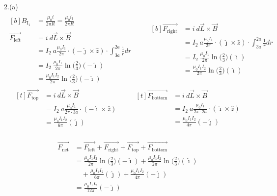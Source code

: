 \documentclass[11pt]{article}
\begin{document}
2.(a)
\begin{align*}
\begin{aligned}[b]
B_{\mathrm{I}_1} &= \frac{\mu_0 i}{2 \pi R} = \frac{\mu_0 i_1 }{2 \pi R} \\
\\
\overrightarrow{F_{\mathrm{left}}} &= i\ d\vec{L} \times \vec{B} \\
  &= I_2 \ a \frac{\mu_0 I_1 }{2 \pi } \cdot (-\hat{\jmath} \times \hat{z}) \cdot \int^{2a}_{3a} \frac{1}{r} dr \\
  &= I_2 \ \frac{\mu_0 I_1 }{2 \pi } \ln \bigg(\frac{2}{3} \bigg) (-\hat{\imath}) \\
  &= \frac{\mu_0 I_1 I_2}{2 \pi } \ln \bigg(\frac{2}{3} \bigg) (-\hat{\imath})
\end{aligned}
\qquad
\begin{aligned}[b]
\overrightarrow{F_{\mathrm{right}}} &= i\ d\vec{L} \times \vec{B} \\
  &= I_2 \ a \frac{\mu_0 I_1 }{2 \pi } \cdot (\hat{\jmath} \times \hat{z}) \cdot \int^{2a}_{3a} \frac{1}{r} dr \\
  &= I_2 \ \frac{\mu_0 I_1 }{2 \pi } \ln \bigg(\frac{2}{3} \bigg) (\hat{\imath}) \\
  &= \frac{\mu_0 I_1 I_2}{2 \pi } \ln \bigg(\frac{2}{3} \bigg) (\hat{\imath})
\end{aligned}
\end{align*}
\begin{align*}
\begin{aligned}[t]
\overrightarrow{F_{\mathrm{top}}} &= i\ d\vec{L} \times \vec{B} \\
  &= I_2 \ a \frac{\mu_0 I_1 }{2 \pi \cdot 3a} \cdot (-\hat{\imath} \times \hat{z})\\
  &= \frac{\mu_0 I_1 I_2}{6 \pi } ({\hat{\jmath}}) \\
\end{aligned}
\qquad
\begin{aligned}[t]
\overrightarrow{F_{\mathrm{bottom}}} &= i\ d\vec{L} \times \vec{B} \\
  &= I_2 \ a \frac{\mu_0 I_1 }{2 \pi \cdot 2a} \cdot (\hat{\imath} \times \hat{z})\\
  &= \frac{\mu_0 I_1 I_2}{4 \pi } ({- \hat{\jmath}}) \\
\end{aligned}
\end{align*}

\begin{align*}
\overrightarrow{F_{\mathrm{net}}} &= \overrightarrow{F_{\mathrm{left}}} + \overrightarrow{F_{\mathrm{right}}} + \overrightarrow{F_{\mathrm{top}}} + \overrightarrow{F_{\mathrm{bottom}}} \\
  &= \frac{\mu_0 I_1 I_2}{2 \pi } \ln \bigg(\frac{2}{3} \bigg) (-\hat{\imath}) + \frac{\mu_0 I_1 I_2}{2 \pi } \ln \bigg(\frac{2}{3} \bigg) (\hat{\imath}) \\
  &\quad + \frac{\mu_0 I_1 I_2}{6 \pi} ({\hat{\jmath}}) + \frac{\mu_0 I_1 I_2}{4 \pi} (- {\hat{\jmath}}) \\
  &= \frac{\mu_0 I_1 I_2}{12 \pi} (- {\hat{\jmath}}) \\
\end{align*}
\end{document}

